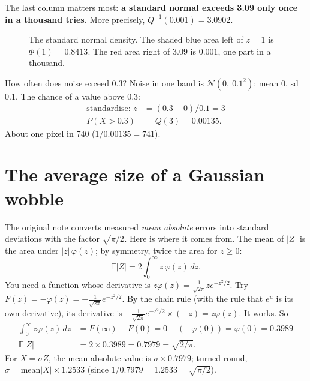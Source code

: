 \documentclass[11pt,a4paper,oneside,openany]{book}
\newcommand{\E}{\mathbb{E}}
\begin{document}
The last column matters most: \textbf{a standard normal exceeds 3.09 only once in a thousand tries.} More precisely,
$Q^{-1}(0.001)=3.0902$.

\begin{figure}[ht]
\centering
{}
\caption{The standard normal density. The shaded blue area left of $z=1$ is $\Phi(1)=0.8413$. The red area right of $3.09$ is
$0.001$, one part in a thousand.}
\label{fig:gauss}
\end{figure}

\begin{worked}[label=we:tail]{How often does noise exceed 0.3?}
Noise in one band is $\mathcal N(0,\ 0.1^2)$: mean 0, sd 0.1. The chance of a value above 0.3:
\begin{align*}
\text{standardise: } z &= (0.3-0)/0.1=3\\
P(X>0.3) &= Q(3)=0.00135 .
\end{align*}
About one pixel in 740 ($1/0.00135=741$).
\end{worked}

\section{The average size of a Gaussian wobble}

The original note converts measured \emph{mean absolute} errors into standard deviations with the factor $\sqrt{\pi/2}$. Here
is where it comes from. The mean of $|Z|$ is the area under $|z|\,\varphi(z)$; by symmetry, twice the area for $z\ge0$:
\[
  \E|Z|=2\int_0^\infty z\,\varphi(z)\,dz .
\]
You need a function whose derivative is $z\varphi(z)=\frac{1}{\sqrt{2\pi}}ze^{-z^2/2}$. Try $F(z)=-\varphi(z)=-\frac{1}{\sqrt{2\pi}}e^{-z^2/2}$.
By the chain rule (with the rule that $e^u$ is its own derivative), its derivative is
$-\frac1{\sqrt{2\pi}}e^{-z^2/2}\times(-z)=z\varphi(z)$. It works. So
\begin{align*}
\int_0^\infty z\varphi(z)\,dz &= F(\infty)-F(0)=0-(-\varphi(0))=\varphi(0)=0.3989\\
\E|Z| &= 2\times0.3989=0.7979=\sqrt{2/\pi} .
\end{align*}
For $X=\sigma Z$, the mean absolute value is $\sigma\times0.7979$; turned round, $\sigma=\text{mean}|X|\times1.2533$ (since
$1/0.7979=1.2533=\sqrt{\pi/2}$).
\end{document}
